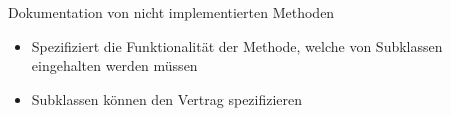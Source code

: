 \documentclass{../tuda-beamer}
\begin{document}
  \begin{frame}{Dokumentation von nicht implementierten Methoden}
    \begin{itemize}
      \item Spezifiziert die Funktionalität der Methode, welche von Subklassen eingehalten werden
      müssen
      \item Subklassen können den Vertrag spezifizieren
    \end{itemize}

    
  \end{frame}

  \begin{frame}[allowframebreaks, c]
    
  \end{frame}

  \begin{frame}[c]
    
  \end{frame}

  \begin{frame}[allowframebreaks, c]
    
  \end{frame}

  \begin{frame}[allowframebreaks, c]
    
  \end{frame}

  \begin{frame}[allowframebreaks, c]
    
  \end{frame}
\end{document}
